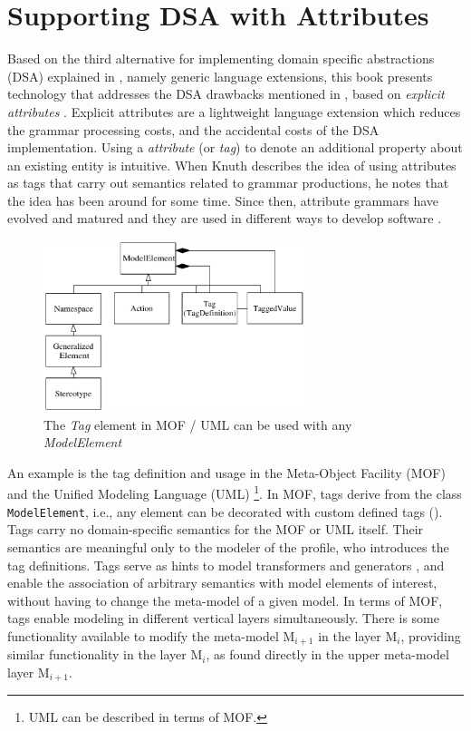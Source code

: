 \section{Supporting DSA with Attributes}
\label{c2.sec.dsa.attributes}

Based on the third alternative for implementing domain specific abstractions (DSA) explained in , namely generic language extensions, this book presents technology that addresses the DSA drawbacks mentioned in , based on \textit{explicit attributes} \cite{hedin.97,java.explicit.programming}. Explicit attributes are a lightweight language extension which reduces the grammar processing costs, and the accidental \cite{brooks.87} costs of the DSA implementation.
%
Using a \textit{attribute} (or \textit{tag}) to denote an additional property about an existing entity is intuitive. When Knuth \cite{knuth.90} describes the idea of using attributes as tags that carry out semantics related to grammar productions, he notes that the idea has been around for some time. Since then, attribute grammars have evolved and matured and they are used in different ways to develop software \cite{attrib.gram}.

\begin{figure}[ht]
	\begin{center}
		\includegraphics[width=!,height=5cm]{ch03/mof-uml-tag}
	\end{center}
	\caption{The \textit{Tag} element in MOF / UML can be used with any \textit{ModelElement}}
	\label{fig:mof-uml-tag}
\end{figure}

An example is the tag definition and usage in the Meta-Object Facility (MOF) \cite{www.mof} and the Unified Modeling Language (UML) \cite{www.uml}\footnote{UML can be described in terms of MOF.}. In MOF, tags derive from the class {\tt Mo\-del\-Ele\-ment}, i.e., any element can be decorated with custom defined tags (). Tags carry no domain-specific semantics for the MOF or UML itself. Their semantics are meaningful only to the modeler of the profile, who introduces the tag definitions. Tags serve as hints to model transformers and generators \cite{mda.frankel}, and enable the association of arbitrary semantics with model elements of interest, without having to change the meta-model of a given model. In terms of MOF, tags enable modeling in different vertical layers simultaneously. There is some functionality available to modify the meta-model M$_{i+1}$ in the layer M$_{i}$, providing similar functionality in the layer M$_{i}$, as found directly in the upper meta-model layer M$_{i+1}$. 

